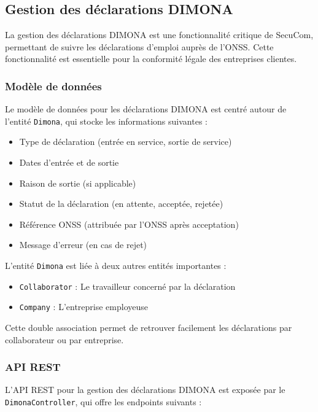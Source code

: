 \subsection{Gestion des déclarations DIMONA}

La gestion des déclarations DIMONA est une fonctionnalité critique de SecuCom, permettant de suivre les déclarations d'emploi auprès de l'ONSS. Cette fonctionnalité est essentielle pour la conformité légale des entreprises clientes.

\subsubsection{Modèle de données}

Le modèle de données pour les déclarations DIMONA est centré autour de l'entité \texttt{Dimona}, qui stocke les informations suivantes :

\begin{itemize}
  \item Type de déclaration (entrée en service, sortie de service)
  \item Dates d'entrée et de sortie
  \item Raison de sortie (si applicable)
  \item Statut de la déclaration (en attente, acceptée, rejetée)
  \item Référence ONSS (attribuée par l'ONSS après acceptation)
  \item Message d'erreur (en cas de rejet)
\end{itemize}

L'entité \texttt{Dimona} est liée à deux autres entités importantes :
\begin{itemize}
  \item \texttt{Collaborator} : Le travailleur concerné par la déclaration
  \item \texttt{Company} : L'entreprise employeuse
\end{itemize}

Cette double association permet de retrouver facilement les déclarations par collaborateur ou par entreprise.

\subsubsection{API REST}

L'API REST pour la gestion des déclarations DIMONA est exposée par le \texttt{DimonaController}, qui offre les endpoints suivants :

